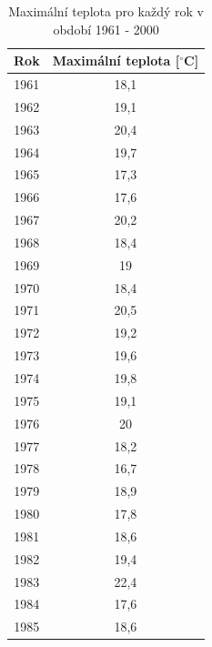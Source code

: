 \documentclass{article}
\begin{document}
 \begin{table}[p]
 	\caption{Maximální teplota pro každý rok v období 1961 - 2000}
 	\begin{tabular}{|c|c|}
 		\hline \rule[-1.5ex]{0pt}{4.5ex} Rok & Maximální teplota [$^\circ$C]  \\
 		\hline \rule[-1ex]{0pt}{3.5ex} 1961   &  18,1  \\ 
 		\hline \rule[-1ex]{0pt}{3.5ex} 1962   &  19,1  \\ 
 		\hline \rule[-1ex]{0pt}{3.5ex} 1963   &  20,4  \\ 
 		\hline \rule[-1ex]{0pt}{3.5ex} 1964   &  19,7  \\ 
 		\hline \rule[-1ex]{0pt}{3.5ex} 1965   &   17,3 \\ 
 		\hline \rule[-1ex]{0pt}{3.5ex} 1966   &   17,6 \\ 
 		\hline \rule[-1ex]{0pt}{3.5ex} 1967   &   20,2 \\ 
 		\hline \rule[-1ex]{0pt}{3.5ex} 1968   &   18,4 \\ 
 		\hline \rule[-1ex]{0pt}{3.5ex} 1969   &   19   \\  
 		\hline \rule[-1ex]{0pt}{3.5ex} 1970   &   18,4 \\ 
 		\hline \rule[-1ex]{0pt}{3.5ex} 1971   &   20,5 \\ 
 		\hline \rule[-1ex]{0pt}{3.5ex} 1972   &   19,2 \\ 
 		\hline \rule[-1ex]{0pt}{3.5ex} 1973   &   19,6 \\ 
 		\hline \rule[-1ex]{0pt}{3.5ex} 1974   &   19,8 \\ 
 		\hline \rule[-1ex]{0pt}{3.5ex} 1975   &   19,1 \\ 
 		\hline \rule[-1ex]{0pt}{3.5ex} 1976   &   20   \\  
 		\hline \rule[-1ex]{0pt}{3.5ex} 1977   &   18,2 \\ 
 		\hline \rule[-1ex]{0pt}{3.5ex} 1978   &   16,7 \\ 
 		\hline \rule[-1ex]{0pt}{3.5ex} 1979   &   18,9 \\ 
 		\hline \rule[-1ex]{0pt}{3.5ex} 1980   &   17,8 \\ 
 		\hline \rule[-1ex]{0pt}{3.5ex} 1981   &   18,6 \\ 
 		\hline \rule[-1ex]{0pt}{3.5ex} 1982   &   19,4 \\ 
 		\hline \rule[-1ex]{0pt}{3.5ex} 1983   &   22,4 \\ 
 		\hline \rule[-1ex]{0pt}{3.5ex} 1984   &   17,6 \\ 
 		\hline \rule[-1ex]{0pt}{3.5ex} 1985   &   18,6 \\ 

\end{tabular}
\end{table}
\end{document}
